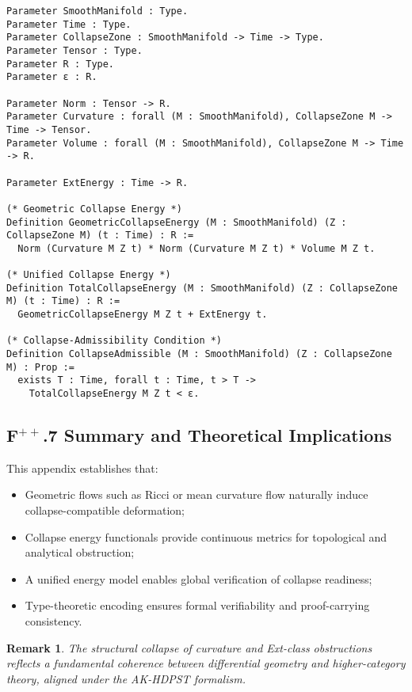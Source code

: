 \documentclass[11pt]{article}
\newtheorem{remark}[theorem]{Remark}
\begin{document}
\begin{lstlisting}[language=Coq, caption={Differential and Unified Collapse Structures}]
Parameter SmoothManifold : Type.
Parameter Time : Type.
Parameter CollapseZone : SmoothManifold -> Time -> Type.
Parameter Tensor : Type.
Parameter R : Type.
Parameter ε : R.

Parameter Norm : Tensor -> R.
Parameter Curvature : forall (M : SmoothManifold), CollapseZone M -> Time -> Tensor.
Parameter Volume : forall (M : SmoothManifold), CollapseZone M -> Time -> R.

Parameter ExtEnergy : Time -> R.

(* Geometric Collapse Energy *)
Definition GeometricCollapseEnergy (M : SmoothManifold) (Z : CollapseZone M) (t : Time) : R :=
  Norm (Curvature M Z t) * Norm (Curvature M Z t) * Volume M Z t.

(* Unified Collapse Energy *)
Definition TotalCollapseEnergy (M : SmoothManifold) (Z : CollapseZone M) (t : Time) : R :=
  GeometricCollapseEnergy M Z t + ExtEnergy t.

(* Collapse-Admissibility Condition *)
Definition CollapseAdmissible (M : SmoothManifold) (Z : CollapseZone M) : Prop :=
  exists T : Time, forall t : Time, t > T ->
    TotalCollapseEnergy M Z t < ε.
\end{lstlisting}

\subsection*{F$^{++}$.7 Summary and Theoretical Implications}

This appendix establishes that:

\begin{itemize}
    \item Geometric flows such as Ricci or mean curvature flow naturally induce collapse-compatible deformation;
    \item Collapse energy functionals provide continuous metrics for topological and analytical obstruction;
    \item A unified energy model enables global verification of collapse readiness;
    \item Type-theoretic encoding ensures formal verifiability and proof-carrying consistency.
\end{itemize}

\begin{remark}
The structural collapse of curvature and Ext-class obstructions reflects a fundamental coherence between differential geometry and higher-category theory, aligned under the AK-HDPST formalism.
\end{remark}
\end{document}
